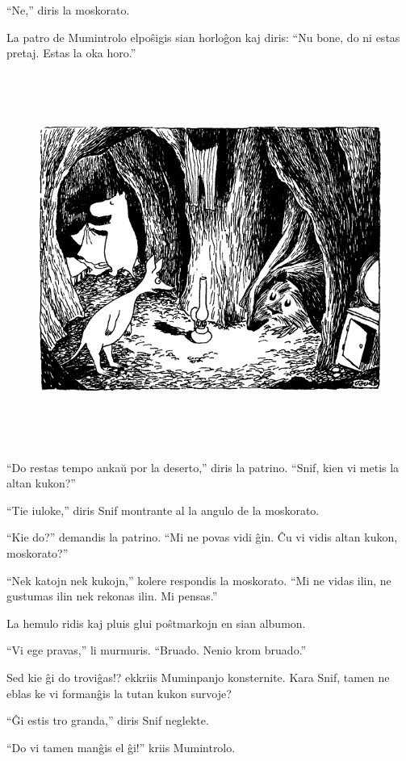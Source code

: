 ``Ne,'' diris la moskorato.

La patro de Mumintrolo elpoŝigis sian horloĝon kaj diris: ``Nu bone, do ni estas pretaj. Estas la oka horo.''

\begin{figure}[htbp]
\centering
\includegraphics[width=449pt,height=346pt]{9-6.png}
\caption{}
\label{9-6}
\end{figure}

``Do restas tempo ankaŭ por la deserto,'' diris la patrino. ``Snif, kien vi metis la altan kukon?''

``Tie iuloke,'' diris Snif montrante al la angulo de la moskorato.

``Kie do?'' demandis la patrino. ``Mi ne povas vidi ĝin. Ĉu vi vidis altan kukon, moskorato?''

``Nek katojn nek kukojn,'' kolere respondis la moskorato. ``Mi ne vidas ilin, ne gustumas ilin nek rekonas ilin. Mi pensas.''

La hemulo ridis kaj pluis glui poŝtmarkojn en sian albumon.

``Vi ege pravas,'' li murmuris. ``Bruado. Nenio krom bruado.''

Sed kie ĝi do troviĝas!? ekkriis Muminpanjo konsternite. Kara Snif, tamen ne eblas ke vi formanĝis la tutan kukon survoje?

``Ĝi estis tro granda,'' diris Snif neglekte.

``Do vi tamen manĝis el ĝi!'' kriis Mumintrolo.

